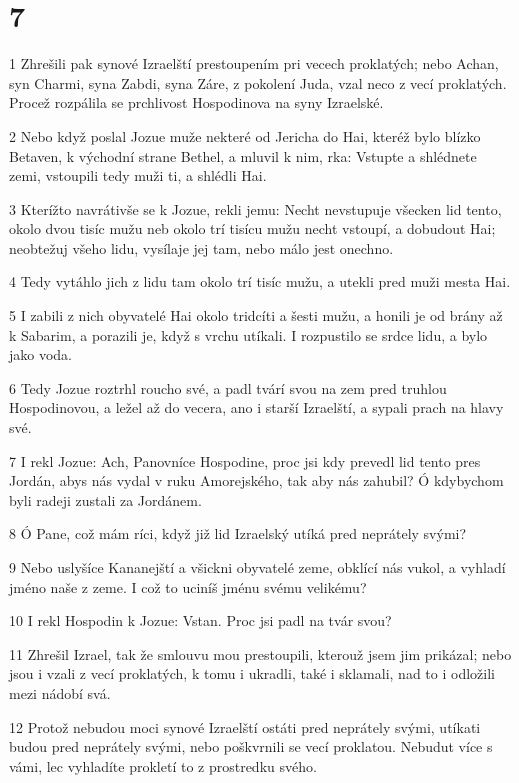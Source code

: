 \chapter{7}

\par 1 Zhrešili pak synové Izraelští prestoupením pri vecech proklatých; nebo Achan, syn Charmi, syna Zabdi, syna Záre, z pokolení Juda, vzal neco z vecí proklatých. Procež rozpálila se prchlivost Hospodinova na syny Izraelské.
\par 2 Nebo když poslal Jozue muže nekteré od Jericha do Hai, kteréž bylo blízko Betaven, k východní strane Bethel, a mluvil k nim, rka: Vstupte a shlédnete zemi, vstoupili tedy muži ti, a shlédli Hai.
\par 3 Kterížto navrátivše se k Jozue, rekli jemu: Necht nevstupuje všecken lid tento, okolo dvou tisíc mužu neb okolo trí tisícu mužu necht vstoupí, a dobudout Hai; neobtežuj všeho lidu, vysílaje jej tam, nebo málo jest onechno.
\par 4 Tedy vytáhlo jich z lidu tam okolo trí tisíc mužu, a utekli pred muži mesta Hai.
\par 5 I zabili z nich obyvatelé Hai okolo tridcíti a šesti mužu, a honili je od brány až k Sabarim, a porazili je, když s vrchu utíkali. I rozpustilo se srdce lidu, a bylo jako voda.
\par 6 Tedy Jozue roztrhl roucho své, a padl tvárí svou na zem pred truhlou Hospodinovou, a ležel až do vecera, ano i starší Izraelští, a sypali prach na hlavy své.
\par 7 I rekl Jozue: Ach, Panovníce Hospodine, proc jsi kdy prevedl lid tento pres Jordán, abys nás vydal v ruku Amorejského, tak aby nás zahubil? Ó kdybychom byli radeji zustali za Jordánem.
\par 8 Ó Pane, což mám ríci, když již lid Izraelský utíká pred neprátely svými?
\par 9 Nebo uslyšíce Kananejští a všickni obyvatelé zeme, obklící nás vukol, a vyhladí jméno naše z zeme. I což to uciníš jménu svému velikému?
\par 10 I rekl Hospodin k Jozue: Vstan. Proc jsi padl na tvár svou?
\par 11 Zhrešil Izrael, tak že smlouvu mou prestoupili, kterouž jsem jim prikázal; nebo jsou i vzali z vecí proklatých, k tomu i ukradli, také i sklamali, nad to i odložili mezi nádobí svá.
\par 12 Protož nebudou moci synové Izraelští ostáti pred neprátely svými, utíkati budou pred neprátely svými, nebo poškvrnili se vecí proklatou. Nebudut více s vámi, lec vyhladíte prokletí to z prostredku svého.
